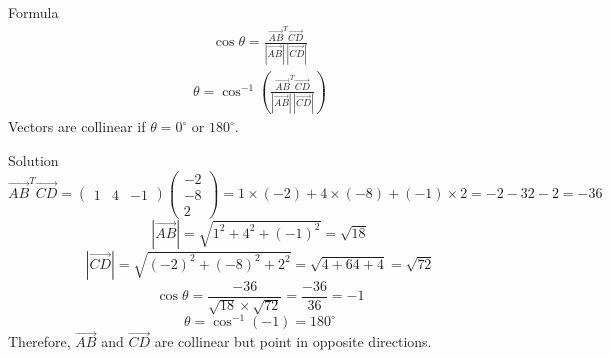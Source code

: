 \documentclass{beamer}
\begin{document}
                                    \begin{frame}{Formula}
                                   \begin{align}
                                    \cos \theta = \frac{\vec{AB}^T \vec{CD}}{|\vec{AB}|\,|\vec{CD}|}
                                    \end{align}
                                    \begin{align}
                                    \theta = \cos^{-1}\left(\frac{\vec{AB}^T \vec{CD}}{|\vec{AB}|\,|\vec{CD}|}\right)
                                    \end{align}
                                    Vectors are collinear if $\theta = 0^\circ$ or $180^\circ$.
                                    \end{frame}

                                    \begin{frame}{Solution}
                                    \[
                                    \vec{AB}^T \vec{CD}
                                    = \begin{pmatrix}1 & 4 & -1\end{pmatrix}
                                    \begin{pmatrix}-2 \\ -8 \\ 2\end{pmatrix}
                                    = 1\times(-2) + 4\times(-8) + (-1)\times 2 = -2 -32 -2 = -36
                                    \]
                                    \[
                                    |\vec{AB}| = \sqrt{1^2 + 4^2 + (-1)^2} = \sqrt{18}
                                    \]
                                    \[
                                    |\vec{CD}| = \sqrt{(-2)^2 + (-8)^2 + 2^2} = \sqrt{4 + 64 + 4} = \sqrt{72}
                                    \]
                                    \[
                                    \cos\theta = \frac{-36}{\sqrt{18}\times\sqrt{72}} = \frac{-36}{36} = -1
                                    \]
                                    \[
                                    \theta = \cos^{-1}(-1) = 180^\circ
                                    \]
                                    Therefore, $\vec{AB}$ and $\vec{CD}$ are collinear but point in opposite directions.
                                    \end{frame}
\end{document}
